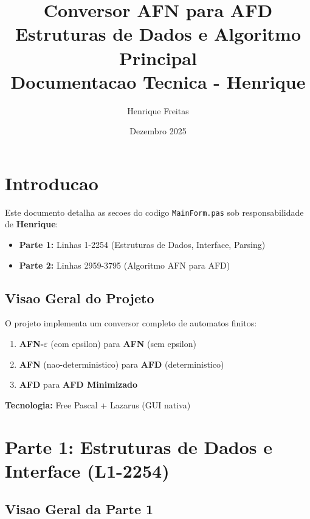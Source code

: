 \documentclass[12pt,a4paper]{article}
\title{\textbf{Conversor AFN para AFD}\\
\Large Estruturas de Dados e Algoritmo Principal\\
\large Documentacao Tecnica - Henrique}
\author{Henrique Freitas}
\date{Dezembro 2025}
\begin{document}
\maketitle
\tableofcontents
\newpage

\section{Introducao}

Este documento detalha as secoes do codigo \texttt{MainForm.pas} sob responsabilidade de \textbf{Henrique}:

\begin{itemize}
    \item \textbf{Parte 1:} Linhas 1-2254 (Estruturas de Dados, Interface, Parsing)
    \item \textbf{Parte 2:} Linhas 2959-3795 (Algoritmo AFN para AFD)
\end{itemize}

\subsection{Visao Geral do Projeto}

O projeto implementa um conversor completo de automatos finitos:
\begin{enumerate}
    \item \textbf{AFN-$\varepsilon$} (com epsilon) para \textbf{AFN} (sem epsilon)
    \item \textbf{AFN} (nao-deterministico) para \textbf{AFD} (deterministico)
    \item \textbf{AFD} para \textbf{AFD Minimizado}
\end{enumerate}

\textbf{Tecnologia:} Free Pascal + Lazarus (GUI nativa)

\newpage
\section{Parte 1: Estruturas de Dados e Interface (L1-2254)}

\subsection{Visao Geral da Parte 1}
\end{document}
